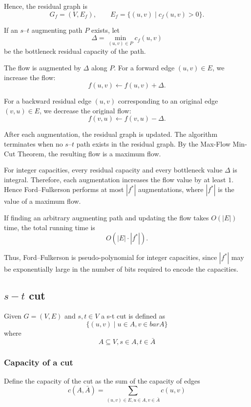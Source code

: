 \documentclass[10pt]{article}
\theoremstyle{definition}
\begin{document}
Hence, the residual graph is
\[
G_f=(V,E_f),
\qquad
E_f=\{(u,v)\mid c_f(u,v)>0\}.
\]

If an $s$--$t$ augmenting path $P$ exists, let
\[
\Delta
=
\min_{(u,v)\in P} c_f(u,v)
\]
be the bottleneck residual capacity of the path.

The flow is augmented by $\Delta$ along $P$. For a forward edge
$(u,v)\in E$, we increase the flow:
\[
f(u,v)\gets f(u,v)+\Delta.
\]

For a backward residual edge $(u,v)$ corresponding to an original edge
$(v,u)\in E$, we decrease the original flow:
\[
f(v,u)\gets f(v,u)-\Delta.
\]

After each augmentation, the residual graph is updated. The algorithm
terminates when no $s$--$t$ path exists in the residual graph. By the
Max-Flow Min-Cut Theorem, the resulting flow is a maximum flow.

For integer capacities, every residual capacity and every bottleneck
value $\Delta$ is integral. Therefore, each augmentation increases the
flow value by at least $1$. Hence Ford--Fulkerson performs at most
$|f^*|$ augmentations, where $|f^*|$ is the value of a maximum flow.

If finding an arbitrary augmenting path and updating the flow takes
$O(|E|)$ time, the total running time is
\[
O(|E|\cdot |f^*|).
\]

Thus, Ford--Fulkerson is pseudo-polynomial for integer capacities, since
$|f^*|$ may be exponentially large in the number of bits required to
encode the capacities.

\subsection{$s-t$ cut}
Given $G = (V, E)$ and $s, t \in {V}$ a s-t cut is defined as 
\[\{(u, v)\mid u \in A, v \in bar{A}\}\]
where 
\[A \subseteq V, s\in A, t \in \bar{A} \]

\subsubsection*{Capacity of a cut}
Define the capacity of the cut as the sum of the capacity of edges
\[c(A, \bar{A}) = \sum_{(u, v) \in E, u \in A, v \in \bar{A}} c(u, v)\]
\end{document}
